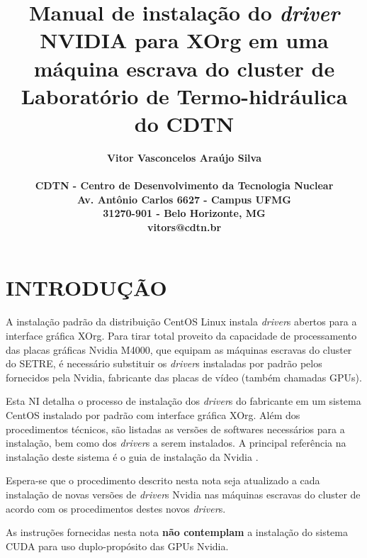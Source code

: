 \documentclass[twoside,a4paper,12pt,english]{inac17}
\title{Manual de instalação do \textit{driver} NVIDIA para XOrg em uma máquina escrava do cluster de Laboratório de Termo-hidráulica do CDTN}
\author{
  \bf{Vitor Vasconcelos Ara\'ujo Silva}\\ \\
  CDTN - Centro de Desenvolvimento da Tecnologia Nuclear\\
  Av. Ant\^onio Carlos 6627 - Campus UFMG\\
  31270-901 - Belo Horizonte, MG\\
  vitors@cdtn.br}
\begin{document}
\maketitle



\pagestyle{myheadings}
\thispagestyle{empty}
\markboth{}{}


\thispagestyle{empty}

\begin{abstract_full_paper}
\end{abstract_full_paper}

\section{INTRODUÇÃO}\label{int}

A instalação padrão da distribuição CentOS Linux instala \textit{driver}s 
abertos para a interface gráfica XOrg. Para tirar total proveito 
da capacidade de processamento das placas gráficas Nvidia M4000, 
que equipam as máquinas escravas do cluster do SETRE, é necessário 
substituir os \textit{driver}s instaladas por padrão pelos fornecidos pela 
Nvidia, fabricante das placas de vídeo (também chamadas GPUs). 

Esta NI detalha o processo de instalação dos \textit{driver}s do fabricante 
em um sistema CentOS instalado por padrão com interface gráfica XOrg. 
Além dos procedimentos técnicos, são listadas as versões de softwares 
necessários para a instalação, bem como dos \textit{driver}s a serem instalados. A principal referência na instalação deste sistema 
é o guia de instalação da Nvidia \cite{inst-nvidia}.

Espera-se que o procedimento descrito nesta nota seja atualizado 
a cada instalação de novas versões de \textit{driver}s Nvidia nas máquinas 
escravas do cluster de acordo com os procedimentos destes novos 
\textit{driver}s.

As instruções fornecidas nesta nota \textbf{não contemplam} a 
instalação do sistema CUDA para uso duplo-propósito das GPUs 
Nvidia.

\end{document}
